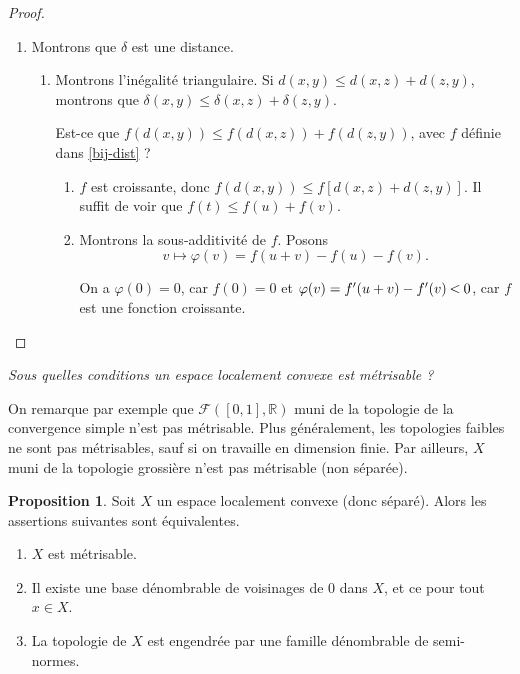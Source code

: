 \documentclass[french]{book}
\theoremstyle{definition}
\newtheorem{protoproposition}{Proposition}[section]
\newenvironment{prop}
    {\colorlet{shadecolor}{blue!5}\begin{shaded}\begin{protoproposition}}
    {\end{protoproposition}\end{shaded}}
\theoremstyle{remark}
\newcommand{\lesss}{\rotatebox[origin=c]{90}{$\land$}}
\newcommand{\less}{\ \lesss\ }
\begin{document}
\begin{proof}
\begin{enumerate}
    \item Montrons que $\delta$ est une distance.

    \begin{enumerate}
      \item Montrons l'inégalité triangulaire. Si $d(x,y) \leq d(x,z) + d(z,y)$, montrons que $\delta(x,y) \leq \delta(x,z) + \delta(z,y)$.

      Est-ce que \(f(d(x,y)) \leq f(d(x,z))+ f(d(z,y))\), avec \(f\) définie dans \ref{bij-dist} ?

      \begin{enumerate}
        \item $f$ est croissante, donc \(f(d(x,y)) \leq f[d(x,z) + d(z,y)]\). Il suffit de voir que $f(t) \leq f(u)+f(v)$.

        \item Montrons la sous-additivité de $f$. Posons \[v  \mapsto \varphi(v) =  f(u+v) - f(u) - f(v). \]

        On a \(\varphi(0) = 0\), car \(f(0) =0\) et \(\varphi(v) = f'(u+v) - f'(v) \less 0\), car $f$ est une fonction croissante.
      \end{enumerate}
    \end{enumerate}
  \end{enumerate}
\end{proof}

\emph{Sous quelles conditions un espace localement convexe est métrisable ?}

On remarque par exemple que $\mathscr{F}([0, 1], \mathbb{R})$ muni de la topologie de la convergence simple n'est pas métrisable. Plus généralement, les topologies faibles ne sont pas métrisables, sauf si on travaille en dimension finie. Par ailleurs, \(X\) muni de la topologie grossière n'est pas métrisable (non séparée).

\begin{prop}\label{elc-metr}
  Soit \(X\) un espace localement convexe (donc séparé). Alors les assertions suivantes sont équivalentes.

  \begin{enumerate}
    \item \(X\) est métrisable.
    \item Il existe une base dénombrable de voisinages de 0 dans \(X\), et ce pour tout \(x \in X\).
    \item La topologie de \(X\) est engendrée par une famille dénombrable de semi-normes.
  \end{enumerate}
\end{prop}
\end{document}
